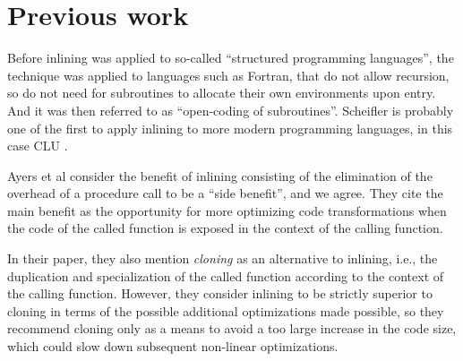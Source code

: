 \section{Previous work}

Before inlining was applied to so-called ``structured programming
languages'', the technique was applied to languages such as Fortran,
that do not allow recursion, so do not need for subroutines to
allocate their own environments upon entry.  And it was then referred
to as ``open-coding of subroutines''.  Scheifler
\cite{Scheifler:1977:AIS:359810.359830} is probably one of the first
to apply inlining to more modern programming languages, in this case
CLU \cite{Liskov:1977:AMC:359763.359789}.

Ayers et al \cite{Ayers:1997:AI:258915.258928} consider the benefit of
inlining consisting of the elimination of the overhead of a procedure
call to be a ``side benefit'', and we agree.  They cite the main
benefit as the opportunity for more optimizing code transformations
when the code of the called function is exposed in the context of the
calling function.

In their paper, they also mention \emph{cloning} as an alternative to
inlining, i.e., the duplication and specialization of the called
function according to the context of the calling function.  However,
they consider inlining to be strictly superior to cloning in terms of
the possible additional optimizations made possible, so they recommend
cloning only as a means to avoid a too large increase in the code
size, which could slow down subsequent non-linear optimizations.

